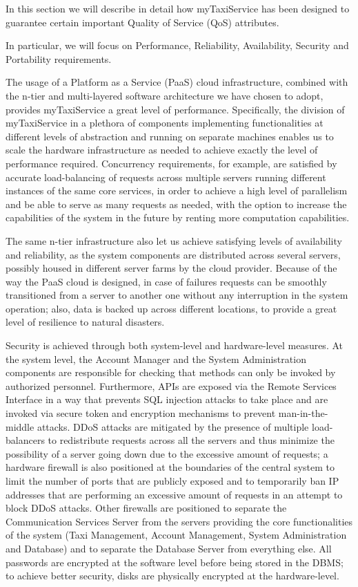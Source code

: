 In this section we will describe in detail how myTaxiService has been designed to guarantee certain important Quality of Service (QoS) attributes.

In particular, we will focus on Performance, Reliability, Availability, Security and Portability requirements.

The usage of a Platform as a Service (PaaS) cloud infrastructure, combined with the n-tier and multi-layered software architecture we have chosen to adopt, provides myTaxiService a great level of performance. Specifically, the division of myTaxiService in a plethora of components implementing functionalities at different levels of abstraction and running on separate machines enables us to scale the hardware infrastructure as needed to achieve exactly the level of performance required. Concurrency requirements, for example, are satisfied by accurate load-balancing of requests across multiple servers running different instances of the same core services, in order to achieve a high level of parallelism and be able to serve as many requests as needed, with the option to increase the capabilities of the system in the future by renting more computation capabilities. 

The same n-tier infrastructure also let us achieve satisfying levels of availability and reliability, as the system components are distributed across several servers, possibly housed in different server farms by the cloud provider. Because of the way the PaaS cloud is designed, in case of failures requests can be smoothly transitioned from a server to another one without any interruption in the system operation; also, data is backed up across different locations, to provide a great level of resilience to natural disasters.

Security is achieved through both system-level and hardware-level measures. At the system level, the Account Manager and the System Administration components are responsible for checking that methods can only be invoked by authorized personnel. Furthermore, APIs are exposed via the Remote Services Interface in a way that prevents SQL injection attacks to take place and are invoked via secure token and encryption mechanisms to prevent man-in-the-middle attacks. DDoS attacks are mitigated by the presence of multiple load-balancers to redistribute requests across all the servers and thus minimize the possibility of a server going down due to the excessive amount of requests; a hardware firewall is also positioned at the boundaries of the central system to limit the number of ports that are publicly exposed and to temporarily ban IP addresses that are performing an excessive amount of requests in an attempt to block DDoS attacks. Other firewalls are positioned to separate the Communication Services Server from the servers providing the core functionalities of the system (Taxi Management, Account Management, System Administration and Database) and to separate the Database Server from everything else. All passwords are encrypted at the software level before being stored in the DBMS; to achieve better security, disks are physically encrypted at the hardware-level.

